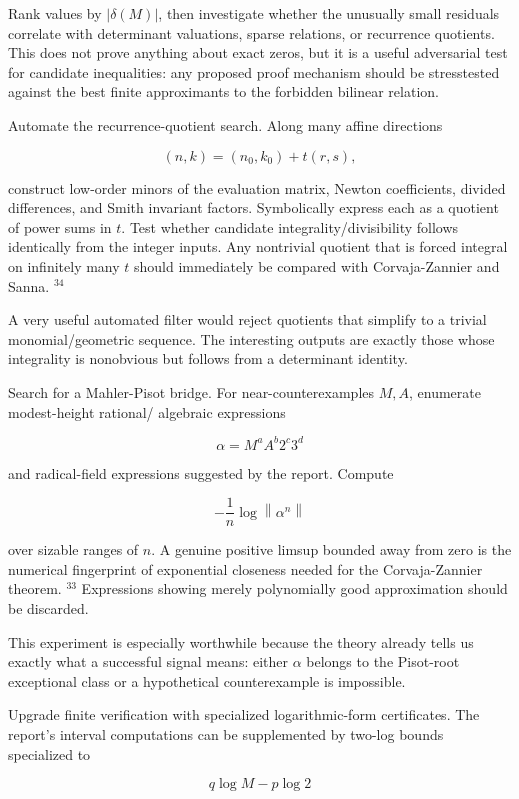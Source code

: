 \documentclass[10pt]{article}
\begin{document}
Rank values by $|\delta(M)|$, then investigate whether the unusually small residuals correlate with determinant valuations, sparse relations, or recurrence quotients. This does not prove anything about exact zeros, but it is a useful adversarial test for candidate inequalities: any proposed proof mechanism should be stresstested against the best finite approximants to the forbidden bilinear relation.

Automate the recurrence-quotient search. Along many affine directions

$$
(n, k)=\left(n_{0}, k_{0}\right)+t(r, s),
$$

construct low-order minors of the evaluation matrix, Newton coefficients, divided differences, and Smith invariant factors. Symbolically express each as a quotient of power sums in $t$. Test whether candidate integrality/divisibility follows identically from the integer inputs. Any nontrivial quotient that is forced integral on infinitely many $t$ should immediately be compared with Corvaja-Zannier and Sanna. ${ }^{34}$

A very useful automated filter would reject quotients that simplify to a trivial monomial/geometric sequence. The interesting outputs are exactly those whose integrality is nonobvious but follows from a determinant identity.

Search for a Mahler-Pisot bridge. For near-counterexamples $M, A$, enumerate modest-height rational/ algebraic expressions

$$
\alpha=M^{a} A^{b} 2^{c} 3^{d}
$$

and radical-field expressions suggested by the report. Compute

$$
-\frac{1}{n} \log \left\|\alpha^{n}\right\|
$$

over sizable ranges of $n$. A genuine positive limsup bounded away from zero is the numerical fingerprint of exponential closeness needed for the Corvaja-Zannier theorem. ${ }^{33}$ Expressions showing merely polynomially good approximation should be discarded.

This experiment is especially worthwhile because the theory already tells us exactly what a successful signal means: either $\alpha$ belongs to the Pisot-root exceptional class or a hypothetical counterexample is impossible.

Upgrade finite verification with specialized logarithmic-form certificates. The report's interval computations can be supplemented by two-log bounds specialized to

$$
q \log M-p \log 2
$$
\end{document}
